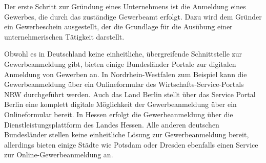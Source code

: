 Der erste Schritt zur Gründung eines Unternehmens ist die Anmeldung eines Gewerbes, die durch das zuständige Gewerbeamt erfolgt. 
 Dazu wird dem Gründer ein Gewerbeschein ausgestellt, der die Grundlage für die Ausübung einer unternehmerischen Tätigkeit darstellt. 
 
 Obwohl es in Deutschland keine einheitliche, übergreifende Schnittstelle zur Gewerbeanmeldung gibt,  bieten einige Bundesländer Portale zur digitalen Anmeldung von Gewerben an. 
 In Nordrhein-Westfalen zum Beispiel kann die Gewerbeanmeldung über ein Onlineformular des Wirtschafts-Service-Portals NRW durchgeführt werden. 
 Auch das Land Berlin stellt über das Service Portal Berlin eine komplett digitale Möglichkeit der Gewerbeanmeldung über ein Onlineformular bereit. 
 In Hessen erfolgt die Gewerbeanmeldung über die Dienstleistungsplattform des Landes Hessen. 
 Alle anderen deutschen Bundesländer stellen keine einheitliche Lösung zur Gewerbeanmeldung bereit, allerdings bieten einige Städte wie Potsdam oder Dresden ebenfalls einen Service zur Online-Gewerbeanmeldung an.

